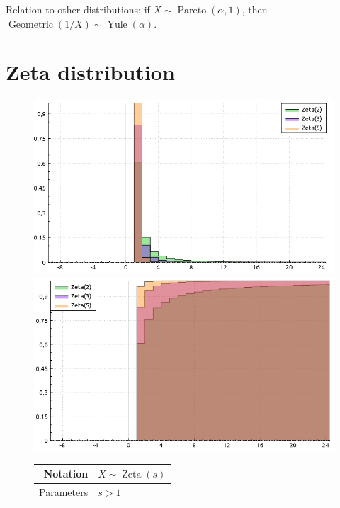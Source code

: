 \documentclass[a4paper,11pt]{article}
\theoremstyle{plain}
\theoremstyle{definition}
\begin{document}
	Relation to other distributions: if $X \sim \operatorname{Pareto}(\alpha, 1)$, then $\operatorname{Geometric}(1/X) \sim \operatorname{Yule}(\alpha)$.
	
	\pagebreak
	\section{Zeta distribution}
		\begin{figure}[!htb]\centering
			\begin{minipage}{0.55\textwidth}
				\includegraphics[width=\linewidth, right]{zeta_pmf}
				\captionsetup{labelformat=empty}
				\includegraphics[width=\linewidth, right]{zeta_cdf}
				\captionsetup{labelformat=empty}
			\end{minipage}
			\begin{minipage}{0.4\textwidth}
				\begin{tabular}{| r | l |}
					\hline
					Notation & $ X \sim \operatorname{Zeta}(s) $ \\
					\hline
					Parameters & $s > 1$ \\
					\hline

\end{tabular}
\end{minipage}
\end{figure}
\end{document}
